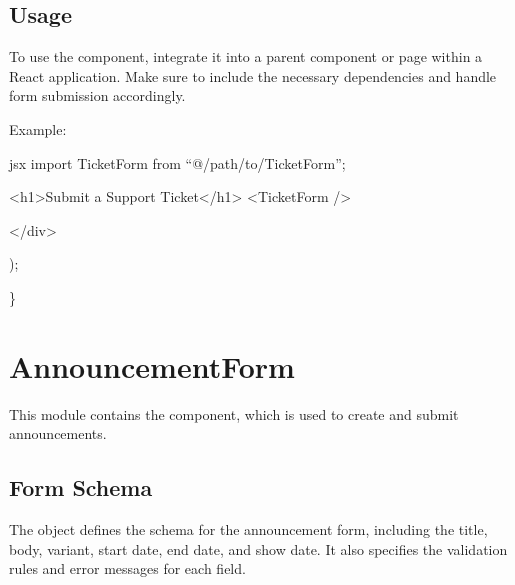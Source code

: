 \documentclass[letterpaper,10pt,english]{sphinxmanual}
\begin{document}
\subsection{Usage}
\label{\detokenize{forms/ticket:id6}}
\sphinxAtStartPar
To use the  component, integrate it into a parent component or page within a React application. Make sure to include the necessary dependencies and handle form submission accordingly.

\sphinxAtStartPar
Example:

\sphinxAtStartPar
{\color{red}\bfseries{}\textasciigrave{}\textasciigrave{}}{\color{red}\bfseries{}\textasciigrave{}}jsx
import TicketForm from “@/path/to/TicketForm”;
\begin{description}
\begin{description}
\begin{description}
\sphinxAtStartPar
\textless{}h1\textgreater{}Submit a Support Ticket\textless{}/h1\textgreater{}
\textless{}TicketForm /\textgreater{}

\end{description}

\sphinxAtStartPar
\textless{}/div\textgreater{}

\end{description}

\sphinxAtStartPar
);

\end{description}

\sphinxAtStartPar
\}

\sphinxstepscope


\section{AnnouncementForm}
\label{\detokenize{forms/announcement:announcementform}}\label{\detokenize{forms/announcement::doc}}
\sphinxAtStartPar
This module contains the  component, which is used to create and submit announcements.


\subsection{Form Schema}
\label{\detokenize{forms/announcement:form-schema}}
\sphinxAtStartPar
The  object defines the schema for the announcement form, including the title, body, variant, start date, end date, and show date. It also specifies the validation rules and error messages for each field.
\end{document}
